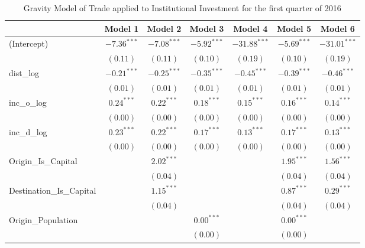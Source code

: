 \begin{table}
	\small
	\caption[Gravity Model of trade for Q1 2016]{Gravity Model of Trade applied to Institutional Investment for the first quarter of 2016}
	\begin{center}
		\begin{tabular}{l c c c c c c }
			\hline
			& Model 1 & Model 2 & Model 3 & Model 4 & Model 5 & Model 6 \\
			\hline
			(Intercept)                  & $-7.36^{***}$ & $-7.08^{***}$ & $-5.92^{***}$ & $-31.88^{***}$ & $-5.69^{***}$ & $-31.01^{***}$ \\
			& $(0.11)$      & $(0.11)$      & $(0.10)$      & $(0.19)$       & $(0.10)$      & $(0.19)$       \\
			dist\_log                    & $-0.21^{***}$ & $-0.25^{***}$ & $-0.35^{***}$ & $-0.45^{***}$  & $-0.39^{***}$ & $-0.46^{***}$  \\
			& $(0.01)$      & $(0.01)$      & $(0.01)$      & $(0.01)$       & $(0.01)$      & $(0.01)$       \\
			inc\_o\_log                  & $0.24^{***}$  & $0.22^{***}$  & $0.18^{***}$  & $0.15^{***}$   & $0.16^{***}$  & $0.14^{***}$   \\
			& $(0.00)$      & $(0.00)$      & $(0.00)$      & $(0.00)$       & $(0.00)$      & $(0.00)$       \\
			inc\_d\_log                  & $0.23^{***}$  & $0.22^{***}$  & $0.17^{***}$  & $0.13^{***}$   & $0.17^{***}$  & $0.13^{***}$   \\
			& $(0.00)$      & $(0.00)$      & $(0.00)$      & $(0.00)$       & $(0.00)$      & $(0.00)$       \\
			Origin\_Is\_Capital          &               & $2.02^{***}$  &               &                & $1.95^{***}$  & $1.56^{***}$   \\
			&               & $(0.04)$      &               &                & $(0.04)$      & $(0.04)$       \\
			Destination\_Is\_Capital     &               & $1.15^{***}$  &               &                & $0.87^{***}$  & $0.29^{***}$   \\
			&               & $(0.04)$      &               &                & $(0.04)$      & $(0.04)$       \\
			Origin\_Population           &               &               & $0.00^{***}$  &                & $0.00^{***}$  &                \\
			&               &               & $(0.00)$      &                & $(0.00)$      &                \\

\end{tabular}
\end{center}
\end{table}
